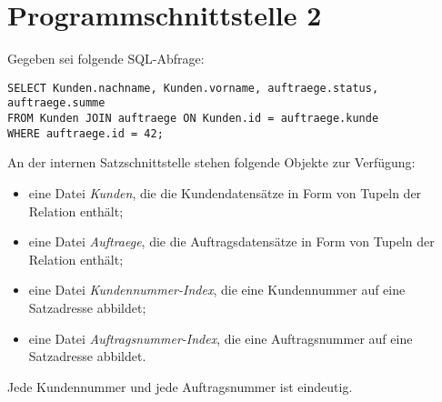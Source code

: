 \section{Programmschnittstelle 2}

Gegeben sei folgende SQL-Abfrage:

\texttt{SELECT Kunden.nachname, Kunden.vorname, auftraege.status, auftraege.summe \\
	FROM Kunden JOIN auftraege ON Kunden.id = auftraege.kunde \\
	WHERE auftraege.id = 42;}

An der internen Satzschnittstelle stehen folgende Objekte zur Verfügung:
\begin{itemize}
	\item eine Datei \emph{Kunden}, die die Kundendatensätze in Form von Tupeln der Relation enthält;
	\item eine Datei \emph{Auftraege}, die die Auftragsdatensätze in Form von Tupeln der Relation enthält;
	\item eine Datei \emph{Kundennummer-Index}, die eine Kundennummer auf eine Satzadresse abbildet;
	\item eine Datei \emph{Auftragsnummer-Index}, die eine Auftragsnummer auf eine Satzadresse abbildet.
\end{itemize}
Jede Kundennummer und jede Auftragsnummer ist eindeutig.


